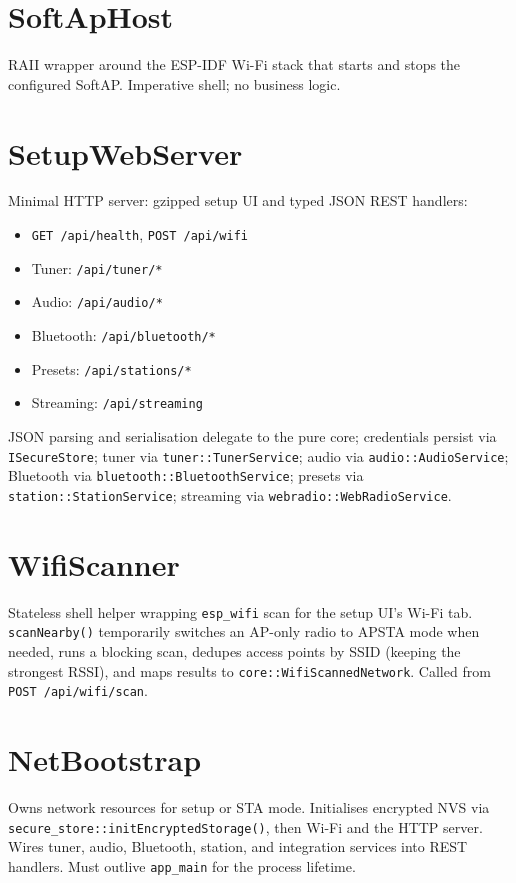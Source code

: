 \section{SoftApHost}\label{cls:SoftApHost}
RAII wrapper around the ESP-IDF Wi-Fi stack that starts and stops the
configured SoftAP. Imperative shell; no business logic.

\section{SetupWebServer}\label{cls:SetupWebServer}
Minimal HTTP server: gzipped setup UI and typed JSON REST handlers:
\begin{itemize}
  \item \texttt{GET /api/health}, \texttt{POST /api/wifi}
  \item Tuner: \texttt{/api/tuner/*}
  \item Audio: \texttt{/api/audio/*}
  \item Bluetooth: \texttt{/api/bluetooth/*}
  \item Presets: \texttt{/api/stations/*}
  \item Streaming: \texttt{/api/streaming}
\end{itemize}
JSON parsing and serialisation delegate to the pure core; credentials persist via \texttt{ISecureStore};
tuner via \texttt{tuner::TunerService}; audio via
\texttt{audio::AudioService}; Bluetooth via \texttt{bluetooth::BluetoothService};
presets via \texttt{station::StationService}; streaming via
\texttt{webradio::WebRadioService}.

\section{WifiScanner}\label{cls:WifiScanner}
Stateless shell helper wrapping \texttt{esp\_wifi} scan for the setup UI's
Wi-Fi tab. \texttt{scanNearby()} temporarily switches an AP-only radio to
APSTA mode when needed, runs a blocking scan, dedupes access points by
SSID (keeping the strongest RSSI), and maps results to
\texttt{core::WifiScannedNetwork}. Called from \texttt{POST /api/wifi/scan}.

\section{NetBootstrap}\label{cls:NetBootstrap}
Owns network resources for setup or STA mode. Initialises encrypted NVS via
\texttt{secure\_store::initEncryptedStorage()}, then Wi-Fi and the HTTP server.
Wires tuner, audio, Bluetooth, station, and integration services into REST
handlers. Must outlive \texttt{app\_main} for the process lifetime.

